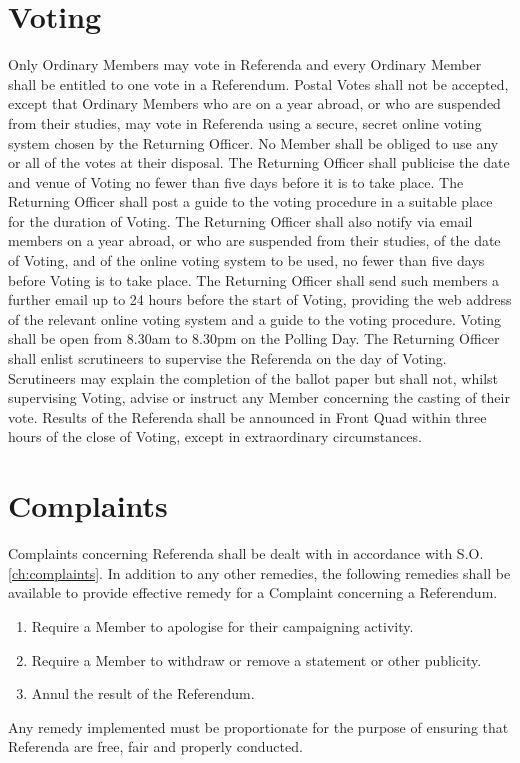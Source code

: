 \section{Voting} \label{sec:ReferendumVoting}
\npara Only Ordinary Members may vote in Referenda and every Ordinary Member shall be entitled to one vote in a Referendum.
\npara Postal Votes shall not be accepted, except that Ordinary Members who are on a year abroad, or who are suspended from their studies, may vote in Referenda using a secure, secret online voting system chosen by the Returning Officer.
\npara No Member shall be obliged to use any or all of the votes at their disposal.
\npara The Returning Officer shall publicise the date and venue of Voting no fewer than five days before it is to take place. The Returning Officer shall post a guide to the voting procedure in a suitable place for the duration of Voting. The Returning Officer shall also notify via email members on a year abroad, or who are suspended from their studies, of the date of Voting, and of the online voting system to be used, no fewer than five days before Voting is to take place. The Returning Officer shall send such members a further email up to 24 hours before the start of Voting, providing the web address of the relevant online voting system and a guide to the voting procedure.
\npara Voting shall be open from 8.30am to 8.30pm on the Polling Day.
\npara The Returning Officer shall enlist scrutineers to supervise the Referenda on the day of Voting. Scrutineers may explain the completion of the ballot paper but shall not, whilst supervising Voting, advise or instruct any Member concerning the casting of their vote.
\npara Results of the Referenda shall be announced in Front Quad within three hours of the close of Voting, except in extraordinary circumstances.
\section{Complaints}
\npara Complaints concerning Referenda shall be dealt with in accordance with S.O. \ref{ch:complaints}.
\npara In addition to any other remedies, the following remedies shall be available to provide effective remedy for a Complaint concerning a Referendum.
\begin{enumerate}
\item Require a Member to apologise for their campaigning activity.
\item Require a Member to withdraw or remove a statement or other publicity.
\item Annul the result of the Referendum.
\end{enumerate}

\npara Any remedy implemented must be proportionate for the purpose of ensuring that Referenda are free, fair and properly conducted.

